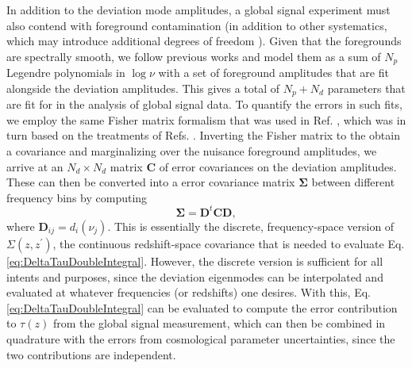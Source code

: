 \documentclass[twocolumn,aps,prd,nofootinbib,showpacs]{revtex4-1}
\begin{document}
In addition to the deviation mode amplitudes, a global signal experiment must also contend with foreground contamination (in addition to other systematics, which may introduce additional degrees of freedom \cite{switzer_and_liu2014}). Given that the foregrounds are spectrally smooth, we follow previous works \cite{mcquinn_et_al2006} and model them as a sum of $N_p$ Legendre polynomials in $\log \nu$ with a set of foreground amplitudes that are fit alongside the deviation amplitudes. This gives a total of $N_p + N_d$ parameters that are fit for in the analysis of global signal data. To quantify the errors in such fits, we employ the same Fisher matrix formalism that was used in Ref. \cite{presley_et_al2015}, which was in turn based on the treatments of Refs. \cite{pritchard_and_loeb2010,bernardi_et_al2015}. Inverting the Fisher matrix to the obtain a covariance and marginalizing over the nuisance foreground amplitudes, we arrive at an $N_d \times N_d$ matrix $\mathbf{C}$ of error covariances on the deviation amplitudes. These can then be converted into a error covariance matrix $\boldsymbol \Sigma$ between different frequency bins by computing
\begin{equation}
\boldsymbol \Sigma = \mathbf{D}^t \mathbf{C} \mathbf{D},
\end{equation}
where $\mathbf{D}_{ij} = d_i (\nu_j) $. This is essentially the discrete, frequency-space version of $\Sigma ( z, z^\prime)$, the continuous redshift-space covariance that is needed to evaluate Eq. \eqref{eq:DeltaTauDoubleIntegral}. However, the discrete version is sufficient for all intents and purposes, since the deviation eigenmodes can be interpolated and evaluated at whatever frequencies (or redshifts) one desires. With this, Eq. \eqref{eq:DeltaTauDoubleIntegral} can be evaluated to compute the error contribution to $\tau(z)$ from the global signal measurement, which can then be combined in quadrature with the errors from cosmological parameter uncertainties, since the two contributions are independent.
\end{document}
